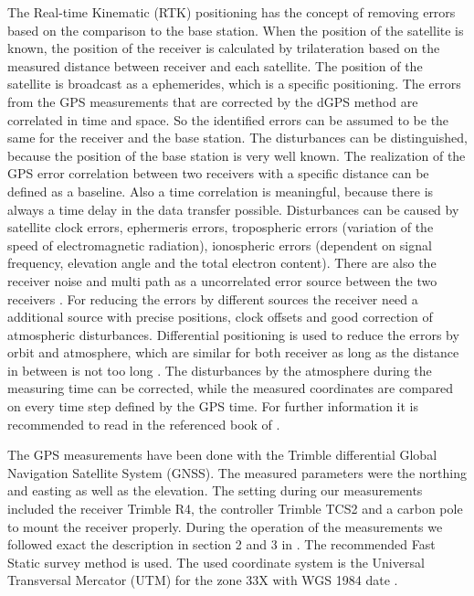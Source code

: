 The Real-time Kinematic (RTK) positioning has the concept of removing errors based on the comparison to the base station.
When the position of the satellite is known, the position of the receiver is calculated by trilateration based on the measured distance between receiver and each satellite.
The position of the satellite is broadcast as a ephemerides, which is a specific positioning.
The errors from the GPS measurements that are corrected by the dGPS method are correlated in time and space.
So the identified errors can be assumed to be the same for the receiver and the base station.
The disturbances can be distinguished, because the position of the base station is very well known.
The realization of the GPS error correlation between two receivers with a specific distance can be defined as a baseline.
Also a time correlation is meaningful, because there is always a time delay in the data transfer possible.
Disturbances can be caused by satellite clock errors, ephermeris errors, tropospheric errors (variation of the speed of electromagnetic radiation), ionospheric errors (dependent on signal frequency, elevation angle and the total electron content). 
There are also the receiver noise and multi path as a uncorrelated error source between the two receivers \citep{UGPS}.
For reducing the errors by different sources the receiver need a additional source with precise positions, clock offsets and good correction of atmospheric disturbances. 
Differential positioning is used to reduce the errors by orbit and atmosphere, which are similar for both receiver as long as the distance in between is not too long \citep{Trprocess}.
The disturbances by the atmosphere during the measuring time can be corrected, while the measured coordinates are compared on every time step defined by the GPS time.
For further information it is recommended to read in the referenced book of \citep{UGPS}.
\medskip

The GPS measurements have been done with the Trimble differential Global Navigation Satellite System (GNSS). 
The measured parameters were the northing and easting as well as the elevation. 
The setting during our measurements included the receiver Trimble R4,
the controller Trimble TCS2 and a carbon pole to mount the receiver properly.
During the operation of the measurements we followed exact the description in section 2 and 3 in \cite{Trquickstart}. 
The recommended Fast Static survey method is used.
The used coordinate system is the Universal Transversal Mercator (UTM) for the zone 33X with WGS 1984 date \citep{Trquickstart}. 
\medskip

